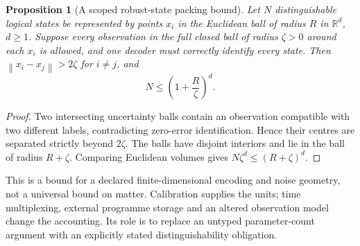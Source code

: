 \documentclass[11pt,a4paper]{article}
\newtheorem{proposition}[theorem]{Proposition}
\theoremstyle{definition}
\theoremstyle{remark}
\newcommand{\R}{\mathbb{R}}
\newcommand{\norm}[1]{\left\lVert#1\right\rVert}
\begin{document}
\begin{proposition}[A scoped robust-state packing bound]\label{prop:packing}
Let $N$ distinguishable logical states be represented by points $x_i$ in the Euclidean ball of radius $R$ in $\R^d$, $d\geq1$. Suppose every observation in the full closed ball of radius $\zeta>0$ around each $x_i$ is allowed, and one decoder must correctly identify every state. Then $\norm{x_i-x_j}>2\zeta$ for $i\ne j$, and
\[
 N\leq\left(1+\frac{R}{\zeta}\right)^d.
\]
\end{proposition}
\begin{proof}
Two intersecting uncertainty balls contain an observation compatible with two different labels, contradicting zero-error identification. Hence their centres are separated strictly beyond $2\zeta$. The balls have disjoint interiors and lie in the ball of radius $R+\zeta$. Comparing Euclidean volumes gives $N\zeta^d\leq(R+\zeta)^d$.
\end{proof}
This is a bound for a declared finite-dimensional encoding and noise geometry, not a universal bound on matter. Calibration supplies the units; time multiplexing, external programme storage and an altered observation model change the accounting. Its role is to replace an untyped parameter-count argument with an explicitly stated distinguishability obligation.
\end{document}
